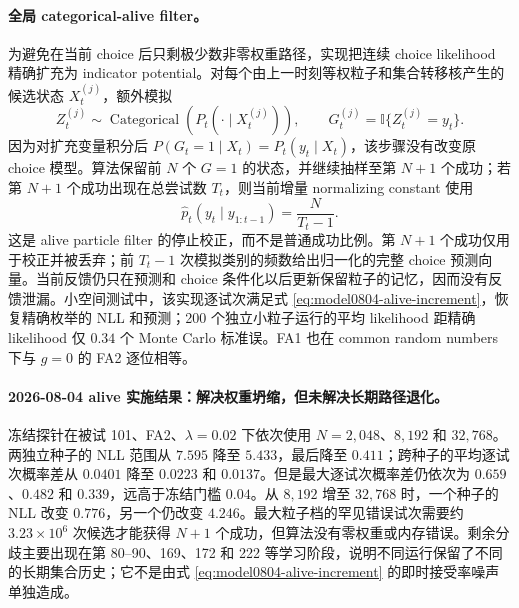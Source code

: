 \paragraph{全局 categorical-alive filter。}
为避免在当前 choice 后只剩极少数非零权重路径，实现把连续 choice likelihood 精确扩充为 indicator potential。对每个由上一时刻等权粒子和集合转移核产生的候选状态 $X^{(j)}_t$，额外模拟
\begin{equation}
 Z^{(j)}_t\sim\operatorname{Categorical}
 \left(P_t(\cdot\mid X^{(j)}_t)\right),
 \qquad
 G^{(j)}_t=\mathbb I\{Z^{(j)}_t=y_t\}.
\end{equation}
因为对扩充变量积分后 $P(G_t=1\mid X_t)=P_t(y_t\mid X_t)$，该步骤没有改变原 choice 模型。算法保留前 $N$ 个 $G=1$ 的状态，并继续抽样至第 $N+1$ 个成功；若第 $N+1$ 个成功出现在总尝试数 $T_t$，则当前增量 normalizing constant 使用
\begin{equation}
 \widehat p_t(y_t\mid y_{1:t-1})=\frac{N}{T_t-1}.
 \label{eq:model0804-alive-increment}
\end{equation}
这是 alive particle filter 的停止校正，而不是普通成功比例。第 $N+1$ 个成功仅用于校正并被丢弃；前 $T_t-1$ 次模拟类别的频数给出归一化的完整 choice 预测向量。当前反馈仍只在预测和 choice 条件化以后更新保留粒子的记忆，因而没有反馈泄漏。小空间测试中，该实现逐试次满足式 \ref{eq:model0804-alive-increment}，恢复精确枚举的 NLL 和预测；200 个独立小粒子运行的平均 likelihood 距精确 likelihood 仅 $0.34$ 个 Monte Carlo 标准误。FA1 也在 common random numbers 下与 $g=0$ 的 FA2 逐位相等。

\paragraph{2026-08-04 alive 实施结果：解决权重坍缩，但未解决长期路径退化。}
冻结探针在被试 101、FA2、$\lambda=0.02$ 下依次使用 $N=2{,}048$、$8{,}192$ 和 $32{,}768$。两独立种子的 NLL 范围从 $7.595$ 降至 $5.433$，最后降至 $0.411$；跨种子的平均逐试次概率差从 $0.0401$ 降至 $0.0223$ 和 $0.0137$。但是最大逐试次概率差仍依次为 $0.659$、$0.482$ 和 $0.339$，远高于冻结门槛 $0.04$。从 $8{,}192$ 增至 $32{,}768$ 时，一个种子的 NLL 改变 $0.776$，另一个仍改变 $4.246$。最大粒子档的罕见错误试次需要约 $3.23\times10^6$ 次候选才能获得 $N+1$ 个成功，但算法没有零权重或内存错误。剩余分歧主要出现在第 80--90、169、172 和 222 等学习阶段，说明不同运行保留了不同的长期集合历史；它不是由式 \ref{eq:model0804-alive-increment} 的即时接受率噪声单独造成。

